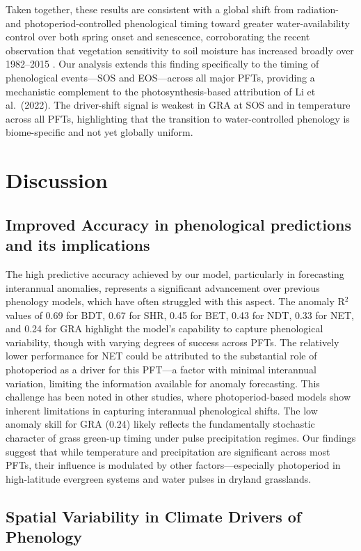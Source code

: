 \documentclass[pdflatex,sn-mathphys-num]{sn-jnl}%
\theoremstyle{thmstyleone}%
\theoremstyle{thmstyletwo}%
\theoremstyle{thmstylethree}%
\begin{document}
Taken together, these results are consistent with a global shift from radiation- and photoperiod-controlled phenological timing toward greater water-availability control over both spring onset and senescence, corroborating the recent observation that vegetation sensitivity to soil moisture has increased broadly over 1982--2015 \citep{wang_comparison_2022}. Our analysis extends this finding specifically to the timing of phenological events—SOS and EOS—across all major PFTs, providing a mechanistic complement to the photosynthesis-based attribution of Li et al.\ (2022). The driver-shift signal is weakest in GRA at SOS and in temperature across all PFTs, highlighting that the transition to water-controlled phenology is biome-specific and not yet globally uniform.


\section{Discussion}\label{sec3}

\subsection{Improved Accuracy in phenological predictions and its implications}\label{subsec2}
The high predictive accuracy achieved by our model, particularly in forecasting interannual anomalies, represents a significant advancement over previous phenology models, which have often struggled with this aspect. The anomaly R$^2$ values of 0.69 for BDT, 0.67 for SHR, 0.45 for BET, 0.43 for NDT, 0.33 for NET, and 0.24 for GRA highlight the model's capability to capture phenological variability, though with varying degrees of success across PFTs. The relatively lower performance for NET could be attributed to the substantial role of photoperiod as a driver for this PFT—a factor with minimal interannual variation, limiting the information available for anomaly forecasting. This challenge has been noted in other studies, where photoperiod-based models show inherent limitations in capturing interannual phenological shifts. The low anomaly skill for GRA (0.24) likely reflects the fundamentally stochastic character of grass green-up timing under pulse precipitation regimes. Our findings suggest that while temperature and precipitation are significant across most PFTs, their influence is modulated by other factors—especially photoperiod in high-latitude evergreen systems and water pulses in dryland grasslands.
\subsection{Spatial Variability in Climate Drivers of Phenology}\label{subsec2}
\end{document}
